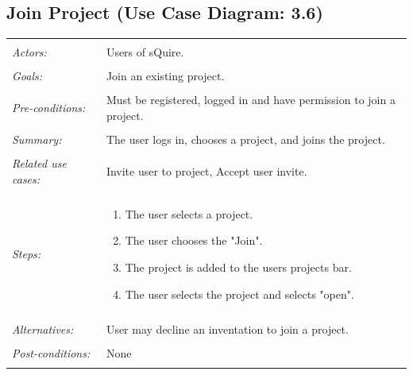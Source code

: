 \documentclass[11pt]{report}
\begin{document}
\subsection{Join Project (Use Case Diagram: 3.6)}
\begin{tabular}{ p{2cm} p{12cm} }
\hline
\\
\textit{Actors:} & Users of sQuire. \\ 
\\
\textit{Goals:} & Join an existing project.\\
\\
\textit{Pre-conditions:} & Must be registered, logged in and have permission to join a project.\\
\\
\textit{Summary:} & The user logs in, chooses a project, and joins the project. \\
\\
\textit{Related use cases:} & Invite user to project, Accept user invite. \\
\\
\textit{Steps:} & \begin{enumerate}
 \item The user selects a project.
 \item The user chooses the "Join". 
 \item The project is added to the users projects bar.
 \item The user selects the project and selects "open".
\end{enumerate}\\
\\
\textit{Alternatives:} & User may decline an inventation to join a project. \\
\\
\textit{Post-conditions:} & None \\
\\
\hline
\end{tabular}
\end{document}
